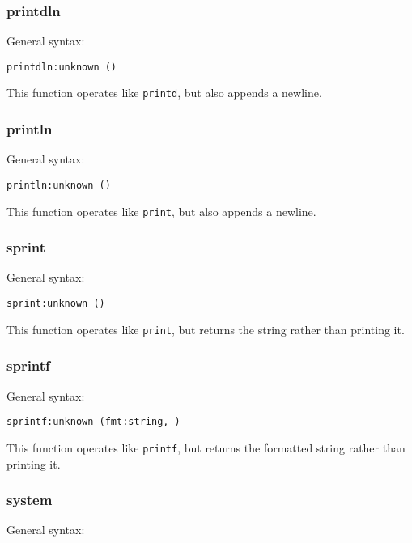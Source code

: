 \documentclass[twoside,english]{article}
\newenvironment{vindent}
{\begin{list}{}{\setlength{\listparindent}{6pt}}
\item[]}
{\end{list}}
\begin{document}
\subsubsection{printdln}
General syntax:

\begin{vindent}
\begin{verbatim}
printdln:unknown ()
\end{verbatim}
\end{vindent}
This function operates like \texttt{printd}, but also appends a newline.

\subsubsection{println}
General syntax:

\begin{vindent}
\begin{verbatim}
println:unknown ()
\end{verbatim}
\end{vindent}
This function operates like \texttt{print}, but also appends a newline.

\subsubsection{sprint}
General syntax:

\begin{vindent}
\begin{verbatim}
sprint:unknown ()
\end{verbatim}
\end{vindent}
This function operates like \texttt{print}, but returns the string rather
than printing it.

\subsubsection{sprintf}
General syntax:

\begin{vindent}
\begin{verbatim}
sprintf:unknown (fmt:string, )
\end{verbatim}
\end{vindent}
This function operates like \texttt{printf}, but returns the formatted string
rather than printing it.


\subsubsection{system}
General syntax:
\end{document}

